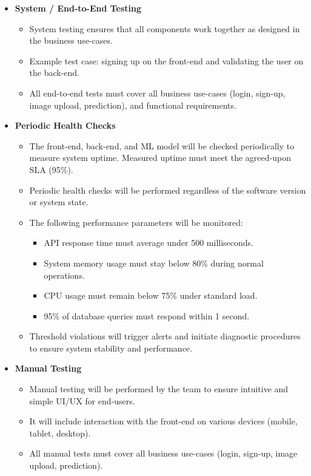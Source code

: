 \documentclass[12pt, titlepage]{article}
\begin{document}
\begin{itemize}
  \item[] \textbf{System / End-to-End Testing}
  \begin{itemize}
    \item System testing ensures that all components work together as designed in the business use-cases.
    \item Example test case: signing up on the front-end and validating the user on the back-end.
    \item All end-to-end tests must cover all business use-cases (login, sign-up, image upload, prediction), and functional requirements.
  \end{itemize}

  \item[] \textbf{Periodic Health Checks}
  \begin{itemize}
    \item The front-end, back-end, and ML model will be checked periodically to measure system uptime. Measured uptime must meet the agreed-upon SLA (95\%).
    \item Periodic health checks will be performed regardless of the software version or system state.
    \item The following performance parameters will be monitored:
    \begin{itemize}
      \item API response time must average under 500 milliseconds.
      \item System memory usage must stay below 80\% during normal operations.
      \item CPU usage must remain below 75\% under standard load.
      \item 95\% of database queries must respond within 1 second.
    \end{itemize}
    \item Threshold violations will trigger alerts and initiate diagnostic procedures to ensure system stability and performance.
  \end{itemize}

  \item[] \textbf{Manual Testing}
  \begin{itemize}
    \item Manual testing will be performed by the team to ensure intuitive and simple UI/UX for end-users.
    \item It will include interaction with the front-end on various devices (mobile, tablet, desktop).
    \item All manual tests must cover all business use-cases (login, sign-up, image upload, prediction).
  \end{itemize}


\end{itemize}
\end{document}
